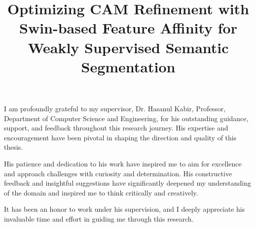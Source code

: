 \documentclass{iutbscthesis}
\title{\Large{Optimizing CAM Refinement with Swin-based Feature Affinity for Weakly Supervised Semantic Segmentation}}
\begin{document}

\coverpage


\titlepage

\declarationofcandidate


\tableofcontents
\listoffigures
\listoftables

\clearpage



\begin{acknowledgement}
    I am profoundly grateful to my supervisor, Dr. Hasanul Kabir, Professor, Department of Computer Science and Engineering, for his outstanding guidance, support, and feedback throughout this research journey. His expertise and encouragement have been pivotal in shaping the direction and quality of this thesis.

His patience and dedication to his work have inspired me to aim for excellence and approach challenges with curiosity and determination. His constructive feedback and insightful suggestions have significantly deepened my understanding of the domain and inspired me to think critically and creatively.

It has been an honor to work under his supervision, and I deeply appreciate his invaluable time and effort in guiding me through this research.
\end{acknowledgement}
\end{document}
